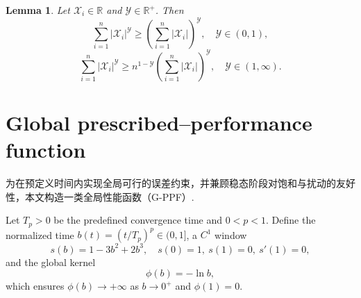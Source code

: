 \documentclass[pdflatex,sn-mathphys-num]{sn-jnl}%
\theoremstyle{thmstyleone}%
\newtheorem{lemma}{Lemma}
\theoremstyle{thmstyletwo}%
\theoremstyle{thmstylethree}%
\begin{document}
\begin{lemma} \label{lemma:3}\cite{HardyLittlewoodPolya_1952_Inequalities} Let $\mathcal{X}_i\in\mathbb{R}$ and $\mathcal{Y}\in\mathbb{R}^+$. Then
	\begin{equation}\label{eq:11}
		\sum_{i=1}^{n}|\mathcal{X}_i|^{\mathcal{Y} } \geq \left(\sum_{i=1}^{n}|\mathcal{X}_i|\right)^{\mathcal{Y} }, \quad \mathcal{Y}  \in (0,1) ,
	\end{equation}
	\begin{equation}\label{eq:12}
		\sum_{i=1}^{n}|\mathcal{X}_i|^{\mathcal{Y} } \geq n^{1-\mathcal{Y} }\left(\sum_{i=1}^{n}|\mathcal{X}_i|\right)^{\mathcal{Y} }, \quad \mathcal{Y}  \in (1,\infty) .
	\end{equation}
\end{lemma}



\section{Global prescribed–performance function}

为在预定义时间内实现全局可行的误差约束，并兼顾稳态阶段对饱和与扰动的友好性，本文构造一类全局性能函数（G-PPF）.

Let $T_p>0$ be the predefined convergence time and $0<p<1$. Define the normalized time $b(t)=(t/T_p)^p\in(0,1]$, a $C^1$ window
\begin{equation}\label{eq:gppf-window}
s(b)=1-3b^2+2b^3,\quad s(0)=1,\ s(1)=0,\ s'(1)=0,
\end{equation}
and the global kernel
\begin{equation}\label{eq:gppf-kernel}
\phi(b) = -\ln b,
\end{equation}
which ensures $\phi(b)\to+\infty$ as $b\to0^+$ and $\phi(1)=0$.
\end{document}
